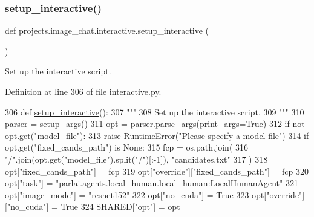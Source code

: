 \subsubsection{\texorpdfstring{setup\+\_\+interactive()}{setup\_interactive()}}
{\footnotesize\ttfamily def projects.\+image\+\_\+chat.\+interactive.\+setup\+\_\+interactive (\begin{DoxyParamCaption}{ }\end{DoxyParamCaption})}

\begin{DoxyVerb}Set up the interactive script.
\end{DoxyVerb}
 

Definition at line 306 of file interactive.\+py.


\begin{DoxyCode}
306 \textcolor{keyword}{def }\hyperlink{namespaceprojects_1_1personality__captions_1_1interactive_aa5144adf4092cfa1c2dc076d766226a1}{setup\_interactive}():
307     \textcolor{stringliteral}{"""}
308 \textcolor{stringliteral}{    Set up the interactive script.}
309 \textcolor{stringliteral}{    """}
310     parser = \hyperlink{namespaceprojects_1_1self__feeding_1_1interactive_a2ad3b874d9caef6e76ea41e029b933f0}{setup\_args}()
311     opt = parser.parse\_args(print\_args=\textcolor{keyword}{True})
312     \textcolor{keywordflow}{if} \textcolor{keywordflow}{not} opt.get(\textcolor{stringliteral}{"model\_file"}):
313         \textcolor{keywordflow}{raise} RuntimeError(\textcolor{stringliteral}{"Please specify a model file"})
314     \textcolor{keywordflow}{if} opt.get(\textcolor{stringliteral}{"fixed\_cands\_path"}) \textcolor{keywordflow}{is} \textcolor{keywordtype}{None}:
315         fcp = os.path.join(
316             \textcolor{stringliteral}{"/"}.join(opt.get(\textcolor{stringliteral}{"model\_file"}).split(\textcolor{stringliteral}{"/"})[:-1]), \textcolor{stringliteral}{"candidates.txt"}
317         )
318         opt[\textcolor{stringliteral}{"fixed\_cands\_path"}] = fcp
319         opt[\textcolor{stringliteral}{"override"}][\textcolor{stringliteral}{"fixed\_cands\_path"}] = fcp
320     opt[\textcolor{stringliteral}{"task"}] = \textcolor{stringliteral}{"parlai.agents.local\_human.local\_human:LocalHumanAgent"}
321     opt[\textcolor{stringliteral}{"image\_mode"}] = \textcolor{stringliteral}{"resnet152"}
322     opt[\textcolor{stringliteral}{"no\_cuda"}] = \textcolor{keyword}{True}
323     opt[\textcolor{stringliteral}{"override"}][\textcolor{stringliteral}{"no\_cuda"}] = \textcolor{keyword}{True}
324     SHARED[\textcolor{stringliteral}{"opt"}] = opt

\end{DoxyCode}
